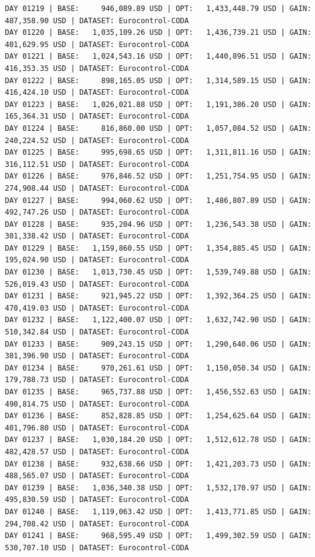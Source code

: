 \documentclass[11pt,a4paper]{article}
\begin{document}
\begin{verbatim}
DAY 01219 | BASE:     946,089.89 USD | OPT:   1,433,448.79 USD | GAIN: 487,358.90 USD | DATASET: Eurocontrol-CODA
DAY 01220 | BASE:   1,035,109.26 USD | OPT:   1,436,739.21 USD | GAIN: 401,629.95 USD | DATASET: Eurocontrol-CODA
DAY 01221 | BASE:   1,024,543.16 USD | OPT:   1,440,896.51 USD | GAIN: 416,353.35 USD | DATASET: Eurocontrol-CODA
DAY 01222 | BASE:     898,165.05 USD | OPT:   1,314,589.15 USD | GAIN: 416,424.10 USD | DATASET: Eurocontrol-CODA
DAY 01223 | BASE:   1,026,021.88 USD | OPT:   1,191,386.20 USD | GAIN: 165,364.31 USD | DATASET: Eurocontrol-CODA
DAY 01224 | BASE:     816,860.00 USD | OPT:   1,057,084.52 USD | GAIN: 240,224.52 USD | DATASET: Eurocontrol-CODA
DAY 01225 | BASE:     995,698.65 USD | OPT:   1,311,811.16 USD | GAIN: 316,112.51 USD | DATASET: Eurocontrol-CODA
DAY 01226 | BASE:     976,846.52 USD | OPT:   1,251,754.95 USD | GAIN: 274,908.44 USD | DATASET: Eurocontrol-CODA
DAY 01227 | BASE:     994,060.62 USD | OPT:   1,486,807.89 USD | GAIN: 492,747.26 USD | DATASET: Eurocontrol-CODA
DAY 01228 | BASE:     935,204.96 USD | OPT:   1,236,543.38 USD | GAIN: 301,338.42 USD | DATASET: Eurocontrol-CODA
DAY 01229 | BASE:   1,159,860.55 USD | OPT:   1,354,885.45 USD | GAIN: 195,024.90 USD | DATASET: Eurocontrol-CODA
DAY 01230 | BASE:   1,013,730.45 USD | OPT:   1,539,749.88 USD | GAIN: 526,019.43 USD | DATASET: Eurocontrol-CODA
DAY 01231 | BASE:     921,945.22 USD | OPT:   1,392,364.25 USD | GAIN: 470,419.03 USD | DATASET: Eurocontrol-CODA
DAY 01232 | BASE:   1,122,400.07 USD | OPT:   1,632,742.90 USD | GAIN: 510,342.84 USD | DATASET: Eurocontrol-CODA
DAY 01233 | BASE:     909,243.15 USD | OPT:   1,290,640.06 USD | GAIN: 381,396.90 USD | DATASET: Eurocontrol-CODA
DAY 01234 | BASE:     970,261.61 USD | OPT:   1,150,050.34 USD | GAIN: 179,788.73 USD | DATASET: Eurocontrol-CODA
DAY 01235 | BASE:     965,737.88 USD | OPT:   1,456,552.63 USD | GAIN: 490,814.75 USD | DATASET: Eurocontrol-CODA
DAY 01236 | BASE:     852,828.85 USD | OPT:   1,254,625.64 USD | GAIN: 401,796.80 USD | DATASET: Eurocontrol-CODA
DAY 01237 | BASE:   1,030,184.20 USD | OPT:   1,512,612.78 USD | GAIN: 482,428.57 USD | DATASET: Eurocontrol-CODA
DAY 01238 | BASE:     932,638.66 USD | OPT:   1,421,203.73 USD | GAIN: 488,565.07 USD | DATASET: Eurocontrol-CODA
DAY 01239 | BASE:   1,036,340.38 USD | OPT:   1,532,170.97 USD | GAIN: 495,830.59 USD | DATASET: Eurocontrol-CODA
DAY 01240 | BASE:   1,119,063.42 USD | OPT:   1,413,771.85 USD | GAIN: 294,708.42 USD | DATASET: Eurocontrol-CODA
DAY 01241 | BASE:     968,595.49 USD | OPT:   1,499,302.59 USD | GAIN: 530,707.10 USD | DATASET: Eurocontrol-CODA

\end{verbatim}
\end{document}
